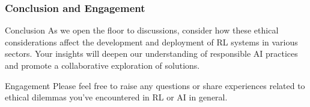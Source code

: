 \documentclass{beamer}
\begin{document}
\begin{frame}[fragile]
    \frametitle{Conclusion and Engagement}
    \begin{block}{Conclusion}
        As we open the floor to discussions, consider how these ethical considerations affect the development and deployment of RL systems in various sectors. Your insights will deepen our understanding of responsible AI practices and promote a collaborative exploration of solutions.
    \end{block}
    
    \begin{block}{Engagement}
        Please feel free to raise any questions or share experiences related to ethical dilemmas you've encountered in RL or AI in general.
    \end{block}
\end{frame}
\end{document}
